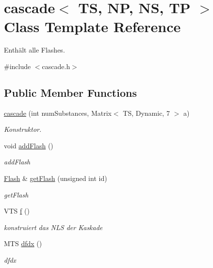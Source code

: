 \hypertarget{classcascade}{}\section{cascade$<$ TS, NP, NS, TP $>$ Class Template Reference}
\label{classcascade}


Enthält alle Flashes.  




{\ttfamily \#include $<$cascade.\+h$>$}

\subsection*{Public Member Functions}
\begin{DoxyCompactItemize}
\item 
\mbox{\hyperlink{classcascade_a9775f4c242df052cfb9c0c8a095a2964}{cascade}} (int num\+Substances, Matrix$<$ TS, Dynamic, 7 $>$ a)
\begin{DoxyCompactList}\small\item\em Konstruktor. \end{DoxyCompactList}\item 
void \mbox{\hyperlink{classcascade_ae1aae44e18b9d87cb710c54726726baa}{add\+Flash}} ()
\begin{DoxyCompactList}\small\item\em add\+Flash \end{DoxyCompactList}\item 
\mbox{\hyperlink{class_flash}{Flash}} \& \mbox{\hyperlink{classcascade_a1608f0fc7e55bd87b4fc1a109ded71fa}{get\+Flash}} (unsigned int id)
\begin{DoxyCompactList}\small\item\em get\+Flash \end{DoxyCompactList}\item 
V\+TS \mbox{\hyperlink{classcascade_a9c5bb14ea8b17d1f79c097c6704f1919}{f}} ()
\begin{DoxyCompactList}\small\item\em konstruiert das N\+LS der Kaskade \end{DoxyCompactList}\item 
M\+TS \mbox{\hyperlink{classcascade_ac72705f0ad01cc88d43c002d63acce13}{dfdx}} ()
\begin{DoxyCompactList}\small\item\em dfdx \end{DoxyCompactList}\end{DoxyCompactItemize}


